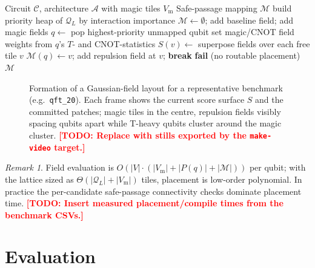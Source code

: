 \documentclass[10pt,conference]{IEEEtran}
\theoremstyle{definition}
\theoremstyle{remark}
\newtheorem{remark}{Remark}
\newcommand{\A}{\mathcal{A}}            %
\newcommand{\C}{\mathcal{C}}            %
\newcommand{\Q}{\mathcal{Q}}            %
\newcommand{\M}{\mathcal{M}}            %
\newcommand{\todo}[1]{\textcolor{red}{\textbf{[TODO: #1]}}}
\newcommand{\figslot}[2][0.95\linewidth]{%
    \setlength{\fboxsep}{0pt}%
    \fbox{\parbox[c][#2][c]{#1}{\centering\footnotesize\itshape
        \textcolor{gray}{[ figure placeholder — #1 wide ]}}}%
}
\begin{document}
\begin{algorithm}[t]
\caption{Gaussian field placement}
\label{alg:main}
\begin{algorithmic}[1]
    \Require Circuit $\C$, architecture $\A$ with magic tiles $V_{\mathrm m}$
    \Ensure Safe-passage mapping $\M$
    \State build priority heap of $\Q_L$ by interaction importance
    \State $\M \gets \emptyset$;\; add baseline field; add magic fields
        \State $q \gets$ pop highest-priority unmapped qubit
        \State set magic/CNOT field weights from $q$'s $T$- and CNOT-statistics
        \State $S(v)\gets$ superpose fields over each free tile $v$ 
            \If{\Call{SafePassage}{$v,q,\M$}}
                \State $\M(q)\gets v$;\; add repulsion field at $v$;\; \textbf{break}
            \EndIf
        \EndFor
         \State \textbf{fail} (no routable placement) \EndIf
    \EndWhile
    \State \Return $\M$
\end{algorithmic}
\end{algorithm}

\begin{figure}[t]
    \centering
    \figslot[0.95\textwidth]{1.7in}
    \caption{Formation of a Gaussian-field layout for a representative
    benchmark (e.g.\ \texttt{qft\_20}). Each frame shows the current score
    surface $S$ and the committed patches; magic tiles in the centre, repulsion
    fields visibly spacing qubits apart while T-heavy qubits cluster around the
    magic cluster. \todo{Replace with stills exported by the
    \texttt{make-video} target.}}
    \label{fig:frames}
\end{figure}

\begin{remark}
Field evaluation is $O(|V|\cdot(|V_{\mathrm m}|+|P(q)|+|\M|))$ per qubit; with
the lattice sized as $\Theta(|\Q_L|+|V_{\mathrm m}|)$ tiles, placement is
low-order polynomial. In practice the per-candidate safe-passage connectivity
checks dominate placement time. \todo{Insert measured placement/compile times
from the benchmark CSVs.}
\end{remark} 

\section{Evaluation}
\label{sec:eval}
\end{document}
